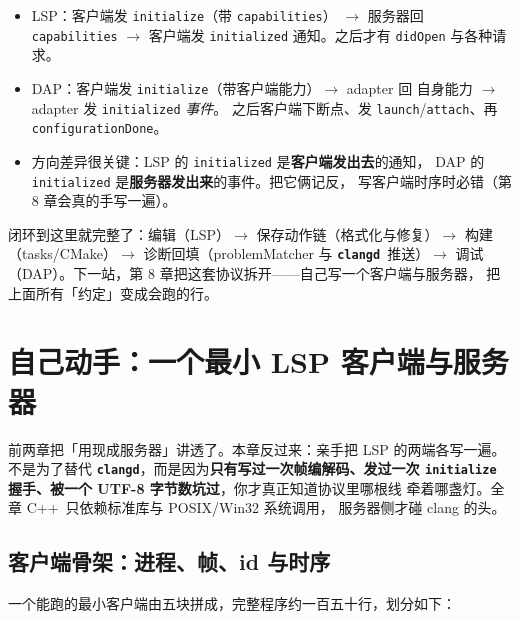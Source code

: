\documentclass[12pt,a4paper,fontset=fandol]{ctexbook}
\newcommand{\Bk}{\discretionary{}{}{}}
\newcommand{\Lib}[1]{\textbf{\texttt{#1}}}
\newcommand{\Lang}[1]{\textsf{#1}}
\newcommand{\CPP}{\Lang{C++}}
\newcommand{\CD}{\Lib{clangd}}
\begin{document}
\begin{compare}[title={DAP 与 LSP 的握手对照}]
\begin{itemize}
  \item LSP：客户端发 \texttt{initialize}（带 \texttt{capabilities}）
        $\to$ 服务器回 \texttt{capabilities} $\to$ 客户端发 \texttt{initialized}
        通知。之后才有 \texttt{didOpen} 与各种请求。
  \item DAP：客户端发 \texttt{initialize}（带客户端能力）$\to$ adapter 回
        自身能力 $\to$ adapter 发 \texttt{initialized} \emph{事件}。
        之后客户端下断点、发 \texttt{launch}/{\Bk}\texttt{attach}、再 \texttt{configurationDone}。
  \item 方向差异很关键：LSP 的 \texttt{initialized} 是\textbf{客户端发出去}的通知，
        DAP 的 \texttt{initialized} 是\textbf{服务器发出来}的事件。把它俩记反，
        写客户端时序时必错（第 8 章会真的手写一遍）。
\end{itemize}
\end{compare}

闭环到这里就完整了：编辑（LSP）$\to$ 保存动作链（格式化与修复）$\to$
构建（tasks/CMake）$\to$ 诊断回填（problemMatcher 与 \CD\ 推送）$\to$
调试（DAP）。下一站，第 8 章把这套协议拆开——自己写一个客户端与服务器，
把上面所有「约定」变成会跑的行。

\chapter{自己动手：一个最小 LSP 客户端与服务器}\label{ch:write-your-own}

前两章把「用现成服务器」讲透了。本章反过来：亲手把 LSP 的两端各写一遍。
不是为了替代 \CD，而是因为\textbf{只有写过一次帧编解码、发过一次
\texttt{initialize} 握手、被一个 UTF-8 字节数坑过}，你才真正知道协议里哪根线
牵着哪盏灯。全章 \CPP\ 只依赖标准库与 POSIX/Win32 系统调用，
服务器侧才碰 clang 的头。

\section{客户端骨架：进程、帧、id 与时序}\label{sec:ch08-s1}

一个能跑的最小客户端由五块拼成，完整程序约一百五十行，划分如下：
\end{document}
